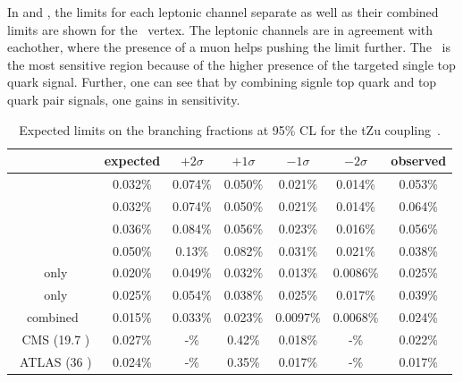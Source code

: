 In  and , the limits for each leptonic channel separate as well as their combined limits are shown for the \Zut\ vertex. The leptonic channels are in agreement with eachother, where the presence of a muon helps pushing the limit further. The \STSR\ is the most sensitive region because of the higher presence of the targeted single top quark signal. Further, one can see that by combining signle top quark and top quark pair signals, one gains in sensitivity. 
\begin{table}[htbp]
	\centering
	\caption{Expected limits on the branching fractions at 95\% CL for the tZu coupling~\cite{Sirunyan:2017kkr,ATLAS-CONF-2017-070}.}
	\begin{tabular}{ccccccc}
		\toprule
		& expected & $+2\sigma$ & $+1\sigma$ & $-1\sigma$ & $-2\sigma$ & observed \\ 
		\midrule
		\mumumu\ & 0.032\% & 0.074\% & 0.050\% & 0.021\% & 0.014\% & 0.053\% \\ 
	
		\emumu\ & 0.032\% & 0.074\% & 0.050\% & 0.021\% & 0.014\% & 0.064\% \\ 
		
		\eemu\ & 0.036\% & 0.084\% & 0.056\% & 0.023\% & 0.016\% & 0.056\% \\ 
		
		\eee\ & 0.050\% & 0.13\% & 0.082\% & 0.031\% & 0.021\% & 0.038\% \\ 
		\hdashline
		\STSR\ only & 0.020\% & 0.049\% & 0.032\% & 0.013\% & 0.0086\% & 0.025\% \\ 
		
		\TTSR\ only & 0.025\% & 0.054\% & 0.038\% & 0.025\% & 0.017\% & 0.039\% \\ 
		\hdashline
		combined & 0.015\% & 0.033\% & 0.023\% & 0.0097\% & 0.0068\% & 0.024\% \\ 
		\hdashline
		8 \TeV\ CMS (19.7 \fbinv)   &0.027\% & -\%  & 0.42\% & 0.018\% & -\% & 0.022\% \\
		\hdashline
		13 \TeV\ ATLAS (36 \fbinv)   & 0.024\% & -\% &   0.35\% & 0.017\%& -\% & 0.017\%\\
		
		\bottomrule
	\end{tabular} 
	\label{tab:ResultsTZU}
\end{table}
